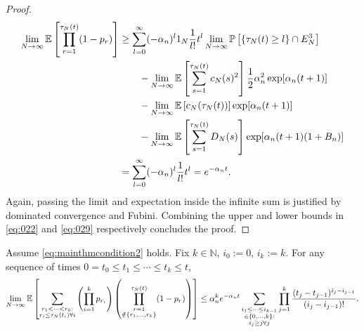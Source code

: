 \begin{proof}
\begin{align}
\lim_{N\to\infty} \mathbb{E} \left[ \prod_{r=1}^{\tau_N(t)} (1-p_r) \right]
&\geq \sum_{l=0}^{\infty} (-\alpha_n)^l 1_N \frac{1}{l!} t^l 
        \lim_{N\to\infty} \mathbb{P}\left[ \{\tau_N(t) \geq l\} \cap E_N^3 \right] \notag\\
    &\qquad- \lim_{N\to\infty} \mathbb{E} \left[ \sum_{s=1}^{\tau_N(t)} c_N(s)^2 \right]
        \frac{1}{2} \alpha_n^2 \exp[ \alpha_n (t+1) ]\notag\\
    &\qquad- \lim_{N\to\infty} \mathbb{E} \left[ c_N(\tau_N(t)) \right] 
        \exp[ \alpha_n (t+1) ] \notag\\
    &\qquad- \lim_{N\to\infty} \mathbb{E} \left[ \sum_{s=1}^{\tau_N(t)} D_N(s) \right]
        \exp[ \alpha_n (t+1) (1+B_n) ] \notag\\
&= \sum_{l=0}^{\infty} (-\alpha_n)^l \frac{1}{l!} t^l
= e^{-\alpha_n t}. \label{eq:029}
\end{align}
Again, passing the limit and expectation inside the infinite sum is justified by dominated convergence and Fubini.
Combining the upper and lower bounds in \eqref{eq:022} and \eqref{eq:029} respectively concludes the proof.
\end{proof}



\begin{lemma}\label{thm:inductionUB}
Assume \eqref{eq:mainthmcondition2} holds.
Fix $k \in \mathbb{N}$, $i_0:=0$, $i_k:=k$. For any sequence of times
$0 = t_0 \leq t_1 \leq \cdots \leq t_k \leq t$,
\begin{equation*}
\lim_{N\to\infty} \mathbb{E} \left[ 
        \sum_{\substack{r_1 <\dots< r_k :\\ r_i \leq \tau_N(t_i) \forall i}}
        \left( \prod_{i=1}^k p_{r_i} \right)
        \left( \prod_{\substack{r=1 \\ \notin \{r_1,\dots,r_k\} }}^{\tau_N(t)} 
        (1-p_r) \right) \right]
\leq \alpha_n^k e^{-\alpha_n t}
        \sum_{\substack{i_1\leq \dots\leq i_{k-1}\\ \in \{0,\dots,k\} :
        \\ i_j \geq j \forall j}} 
        \prod_{j=1}^k \frac{(t_j - t_{j-1})^{i_j - i_{j-1}}}{(i_j - i_{j-1})! } .
\end{equation*}
\end{lemma}

